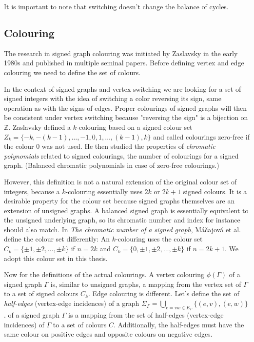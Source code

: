It is important to note that switching doesn't change the balance of cycles.

\subsection{Colouring}

The research in signed graph colouring was initiated by Zaslavsky\cite{zaslavsky-graphs} in the early 1980s and published in multiple seminal papers\cite{zaslavsky-invariants,zaslavsky-colouring,zaslavsky-colourful}. Before defining vertex and edge colouring we need to define the set of colours.

In the context of signed graphs and vertex switching we are looking for a set of signed integers with the idea of switching a color reversing its sign, same operation as with the signs of edges. Proper colourings of signed graphs will then be consistent under vertex switching because "reversing the sign" is a bijection on $\mathbb{Z}$. Zaslavsky\cite{zaslavsky-colouring} defined a $k$-colouring based on a signed colour set $Z_k = \{-k, -(k-1), \dots, -1, 0, 1, \dots, (k-1), k\}$ and called colourings zero-free if the colour $0$ was not used. He then studied the properties of \textit{chromatic polynomials} related to signed colourings, the number of colourings for a signed graph. (Balanced chromatic polynomials in case of zero-free colourings.)

However, this definition is not a natural extension of the original colour set of integers, because a $k$-colouring essentially uses $2k$ or $2k+1$ signed colours. It is a desirable property for the colour set because signed graphs themselves are an extension of unsigned graphs. A balanced signed graph is essentially equivalent to the unsigned underlying graph, so its chromatic number and index for instance should also match. In \textit{The chromatic number of a signed graph}, Máčajová et al. define the colour set differently: An $k$-colouring uses the colour set $C_k = \{\pm 1,\pm 2,\dots,\pm k\}$ if $n = 2k$ and $C_k = \{0, \pm 1,\pm 2,\dots,\pm k\}$ if $n = 2k + 1$. We adopt this colour set in this thesis.

Now for the definitions of the actual colourings. A vertex colouring $\phi(\Gamma)$ of a signed graph $\Gamma$ is, similar to unsigned graphs, a mapping from the vertex set of $\Gamma$ to a set of signed colours $C_k$. Edge colouring is different. Let's define the set of \textit{half-edges} (vertex-edge incidences) of a graph $\Sigma _{\Gamma} = \bigcup _{e = vw \in E _{\Gamma}} \{(e, v), (e, w) \}$. of a signed graph $\Gamma$ is a mapping from the set of half-edges (vertex-edge incidences) of $\Gamma$ to a set of colours $C$. Additionally, the half-edges must have the same colour on positive edges and opposite colours on negative edges.


